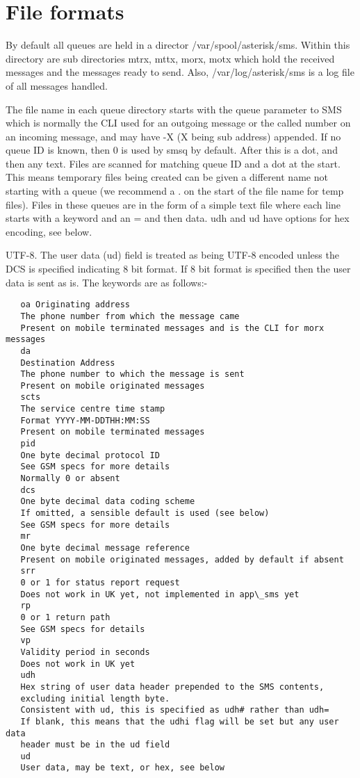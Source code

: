 \section{File formats}

   By default all queues are held in a director /var/spool/asterisk/sms.
   Within this directory are sub directories mtrx, mttx, morx, motx which
   hold the received messages and the messages ready to send. Also,
   /var/log/asterisk/sms is a log file of all messages handled.
   
   The file name in each queue directory starts with the queue parameter
   to SMS which is normally the CLI used for an outgoing message or the
   called number on an incoming message, and may have -X (X being sub
   address) appended. If no queue ID is known, then 0 is used by smsq by
   default. After this is a dot, and then any text. Files are scanned for
   matching queue ID and a dot at the start. This means temporary files
   being created can be given a different name not starting with a queue
   (we recommend a . on the start of the file name for temp files).
   Files in these queues are in the form of a simple text file where each
   line starts with a keyword and an = and then data. udh and ud have
   options for hex encoding, see below.

   UTF-8. The user data (ud) field is treated as being UTF-8 encoded
   unless the DCS is specified indicating 8 bit format. If 8 bit format
   is specified then the user data is sent as is.
   The keywords are as follows:-
\begin{verbatim}
   oa Originating address
   The phone number from which the message came
   Present on mobile terminated messages and is the CLI for morx messages
   da
   Destination Address
   The phone number to which the message is sent
   Present on mobile originated messages
   scts
   The service centre time stamp
   Format YYYY-MM-DDTHH:MM:SS
   Present on mobile terminated messages
   pid
   One byte decimal protocol ID
   See GSM specs for more details
   Normally 0 or absent
   dcs
   One byte decimal data coding scheme
   If omitted, a sensible default is used (see below)
   See GSM specs for more details
   mr
   One byte decimal message reference
   Present on mobile originated messages, added by default if absent
   srr
   0 or 1 for status report request
   Does not work in UK yet, not implemented in app\_sms yet
   rp
   0 or 1 return path
   See GSM specs for details
   vp
   Validity period in seconds
   Does not work in UK yet
   udh
   Hex string of user data header prepended to the SMS contents,
   excluding initial length byte.
   Consistent with ud, this is specified as udh# rather than udh=
   If blank, this means that the udhi flag will be set but any user data
   header must be in the ud field
   ud
   User data, may be text, or hex, see below
\end{verbatim}

